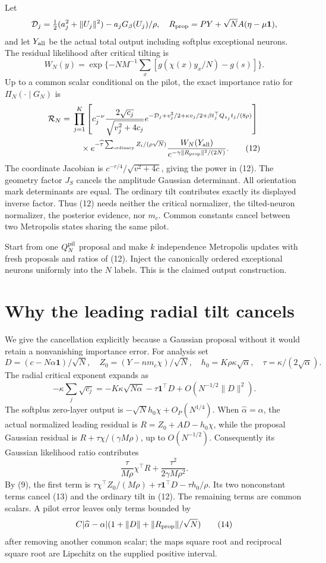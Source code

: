 \documentclass[11pt]{article}
\newcommand{\one}{\mathbf1}\newcommand{\TV}{\mathrm{TV}}
\begin{document}
Let
\[
 \mathcal D_j=\tfrac12(a_j^2+\|U_j\|^2)-a_jG_\beta(U_j)/\rho,
 \quad
 R_{\rm prop}=PY+\sqrt N A(\eta-\mu\one),
\]
and let $Y_{\rm all}$ be the actual total output including softplus
exceptional neurons. The residual likelihood after critical tilting is
\[
 W_N(y)=\exp\{-NM^{-1}\sum_x[g(\chi(x)y_x/N)-g(s)]\}.
\]
Up to a common scalar conditional on the pilot, the exact importance
ratio for $\Pi_N(\cdot\mid G_N)$ is
\begin{align}
 \mathcal R_N={}&\prod_{j=1}^K\left[
 c_j^{-\nu}\frac{2\sqrt{c_j}}{\sqrt{v_j^2+4c_j}}
 e^{-\mathcal D_j+v_j^2/2+\kappa v_j/2+
                         \beta t_j^\top Q_{z_j}t_j/(8\rho)}\right]\notag\\
 &\quad\times e^{-\widehat\tau\sum_{\rm ordinary}Z_i/(\rho\sqrt N)}
       \frac{W_N(Y_{\rm all})}
                    {e^{-\gamma\|R_{\rm prop}\|^2/(2N)}}. \tag{12}
\end{align}
The coordinate Jacobian is $c^{-r/4}/\sqrt{v^2+4c}$, giving the power
in (12). The geometry factor $J_S$ cancels the amplitude Gaussian
determinant. All orientation mark determinants are equal. The ordinary
tilt contributes exactly its displayed inverse factor. Thus (12) needs
neither the critical normalizer, the tilted-neuron normalizer, the
posterior evidence, nor $m_c$. Common constants cancel between two
Metropolis states sharing the same pilot.

Start from one $Q_N^{\rm pil}$ proposal and make $k$ independence
Metropolis updates with fresh proposals and ratios of (12). Inject the
canonically ordered exceptional neurons uniformly into the $N$ labels.
This is the claimed output construction.

\section{Why the leading radial tilt cancels}
We give the cancellation explicitly because a Gaussian proposal without
it would retain a nonvanishing importance error. For analysis set
\[
 D=(c-N\alpha\one)/\sqrt N,\quad
 Z_0=(Y-nm_c\chi)/\sqrt N,\quad
 h_0=K\rho\kappa\sqrt\alpha,\quad \tau=\kappa/(2\sqrt\alpha).
\]
The radial critical exponent expands as
\[
             -\kappa\sum_j\sqrt{c_j}
                =-K\kappa\sqrt{N\alpha}-\tau\one^\top D
                            +O(N^{-1/2}\|D\|^2).        \tag{13}
\]
The softplus zero-layer output is
$-\sqrt N h_0\chi+O_P(N^{1/4})$. When
$\widehat\alpha=\alpha$, the actual normalized leading residual is
$R=Z_0+AD-h_0\chi$, while the proposal Gaussian residual is
$R+\tau\chi/(\gamma M\rho)$, up to $O(N^{-1/2})$.
Consequently its Gaussian likelihood ratio contributes
\[
 \frac\tau{M\rho}\chi^\top R+\frac{\tau^2}{2\gamma M\rho^2}.
\]
By (9), the first term is
$\tau\chi^\top Z_0/(M\rho)+\tau\one^\top D-\tau h_0/\rho$.
Its two nonconstant terms cancel (13) and the ordinary tilt in (12).
The remaining terms are common scalars. A pilot error leaves only
terms bounded by
\[
 C|\widehat\alpha-\alpha|(1+\|D\|+\|R_{\rm prop}\|/\sqrt N)
 \tag{14}
\]
after removing another common scalar; the maps square root and reciprocal
square root are Lipschitz on the supplied positive interval.
\end{document}
